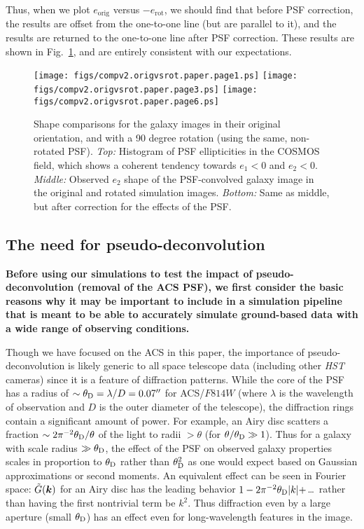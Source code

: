 \documentclass[twocolumn,useAMS,usenatbib]{mn2e}
\newcommand{\newtext}{}
\newcommand{\reftext}[1]{\textbf{#1}}
\begin{document}
Thus, when we plot $e_\mathrm{orig}$ versus
$-e_\mathrm{rot}$, we should find that before PSF correction, the
results are offset from the one-to-one line (but are parallel to it),
and the results are returned to the one-to-one line after PSF
correction.  These results are shown in Fig.~\ref{F:origvsrot}, and
are entirely consistent with our expectations.

\begin{figure}
\begin{center}
\texttt{[image: figs/compv2.origvsrot.paper.page1.ps]}
\texttt{[image: figs/compv2.origvsrot.paper.page3.ps]}
\texttt{[image: figs/compv2.origvsrot.paper.page6.ps]}
\caption{\label{F:origvsrot}
Shape comparisons for the galaxy images in their original orientation,
and with a 90 degree rotation (using the same, non-rotated PSF).  {\em
  Top:} Histogram of PSF ellipticities in the COSMOS field, which
shows a coherent tendency towards $e_1<0$ and $e_2<0$.  {\em Middle:} Observed
  $e_2$ shape of the
  PSF-convolved galaxy image in the original and rotated simulation images.
{\em Bottom:} Same as middle, but after correction for the effects of
the PSF.}
\end{center}
\end{figure}


\subsection{The need for pseudo-deconvolution}\label{SS:pdconv}

\reftext{Before using our simulations to test the impact of
  pseudo-deconvolution (removal of the ACS PSF), we first consider the basic reasons why it may
  be important to include in a simulation pipeline that is meant to be
  able to accurately simulate ground-based data with a wide
  range of observing conditions.}

\newtext{Though we have focused on the ACS in this paper, the importance of
  pseudo-deconvolution is likely generic to all space telescope data
  (including other {\it HST} cameras) since it is a feature of
  diffraction patterns.  While the core of the PSF has a radius of
  $\sim\theta_{\rm D}=\lambda/D=0.07''$ for ACS/$F814W$ (where $\lambda$
  is the wavelength of observation and $D$ is the outer diameter of
  the telescope), the diffraction rings contain a significant amount
  of power.  For example, an Airy disc scatters a fraction $\sim
  2\pi^{-2}\theta_{\rm D}/\theta$ of the light to radii $>\theta$ (for
  $\theta/\theta_{\rm D}\gg 1$). Thus for a galaxy with scale radius
  $\gg\theta_{\rm D}$, the effect of the PSF on observed galaxy
  properties scales in proportion to $\theta_{\rm D}$ rather than
  $\theta_{\rm D}^2$ as one would expect based on Gaussian
  approximations or second moments. An equivalent effect can be seen
  in Fourier space: $\tilde G({\bmath k})$ for an Airy disc has the
  leading behavior $1-2\pi^{-2}\theta_{\rm D}|k|+$\dots\ rather than
  having the first nontrivial term be $k^2$. Thus diffraction even by
  a large aperture (small $\theta_{\rm D}$) has an effect even for
  long-wavelength features in the image.} 
\end{document}
